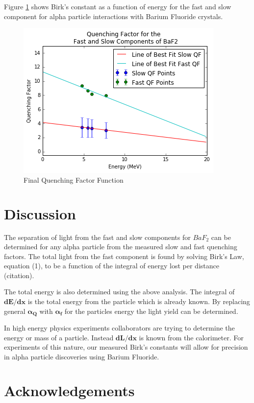 \noindent
Figure \ref{fig:qf} shows Birk's constant as a function of energy for the fast and slow component for alpha particle interactions with Barium Fluoride crystals.

\begin{figure}
  \centering
    \includegraphics[width=.8\columnwidth]{qf.png}
  \caption{Final Quenching Factor Function}
  \label{fig:qf}
\end{figure} 


\section{\label{sec:level1}Discussion}


The separation of light from the fast and slow components for $BaF_2$ can be determined for any alpha particle from the measured slow and fast quenching factors. The total light from the fast component is found by solving Birk's Law, equation (1), to be a function of the integral of energy lost per distance (citation). 


The total energy is also determined using the above analysis. The integral of $\bm{dE/dx}$ is the total energy from the particle which is already known. By replacing general $\bm{\alpha_Q}$ with $\bm{\alpha_f}$ for the particles energy the light yield can be determined. 

In high energy physics experiments collaborators are trying to determine the energy or mass of a particle. Instead $\bm{dL/dx}$ is known from the calorimeter. For experiments of this nature, our measured Birk's constants will allow for precision in alpha particle discoveries using Barium Fluoride. 

\section{\label{sec:level1}Acknowledgements}
\squeezeup

